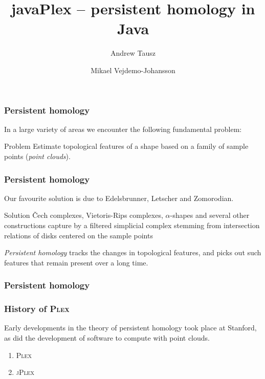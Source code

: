 \documentclass{beamer}
\newcommand\jPlex{\textsc{jPlex}\xspace}
\newcommand\Plex{\textsc{Plex}\xspace}
\begin{document}
\author{Andrew Tausz \and Mikael Vejdemo-Johansson}
\title{javaPlex -- persistent homology in Java}

\frame{\titlepage}

\begin{frame}
  \frametitle{Persistent homology}
  
  In a large variety of areas we encounter the following fundamental problem:

  \begin{block}{Problem}
    Estimate topological features of a shape based on a family of sample points (\emph{point clouds}).
  \end{block}
\end{frame}

\begin{frame}
  \frametitle{Persistent homology}
  
  Our favourite solution is due to Edelsbrunner, Letscher and Zomorodian.

  \begin{block}{Solution}
    \v Cech complexes, Vietoris-Rips complexes, $\alpha$-shapes and several other constructions capture by a filtered simplicial complex stemming from intersection relations of disks centered on the sample points

    \emph{Persistent homology} tracks the changes in topological features, and picks out such features that remain present over a long time.
  \end{block}
\end{frame}

\begin{frame}
  \frametitle{Persistent homology}
\end{frame}

\begin{frame}
  \frametitle{History of \Plex}
  
  Early developments in the theory of persistent homology took place at Stanford, as did the development of software to compute with point clouds.

  \begin{enumerate}
  \item \Plex {}
  \item \jPlex {}
  \end{enumerate}
\end{frame}
\end{document}
